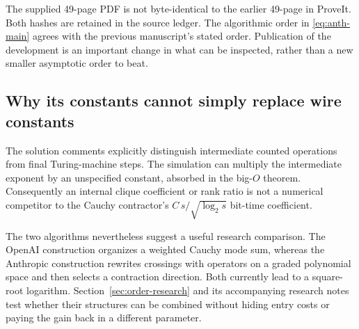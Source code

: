 The supplied 49-page PDF is not byte-identical to the earlier 49-page
 in ProveIt. Both hashes are retained in the source ledger.
The algorithmic order in \eqref{eq:anth-main} agrees with the previous
manuscript's stated order. Publication of the development is an important
change in what can be inspected, rather than a new smaller asymptotic
order to beat.

\subsection{Why its constants cannot simply replace wire constants}

The solution comments explicitly distinguish intermediate counted
operations from final Turing-machine steps. The simulation can multiply
the intermediate exponent by an unspecified constant, absorbed in the
big-$O$ theorem. Consequently an internal clique coefficient or rank
ratio is not a numerical competitor to the Cauchy contractor's
$C\,s/\sqrt{\log_2s}$ bit-time coefficient.

The two algorithms nevertheless suggest a useful research comparison.
The OpenAI construction organizes a weighted Cauchy mode sum, whereas the
Anthropic construction rewrites crossings with operators on a graded
polynomial space and then selects a contraction direction. Both currently
lead to a square-root logarithm. Section~\ref{sec:order-research} and its accompanying research
notes test whether their structures can be combined without hiding entry
costs or paying the gain back in a different parameter.
